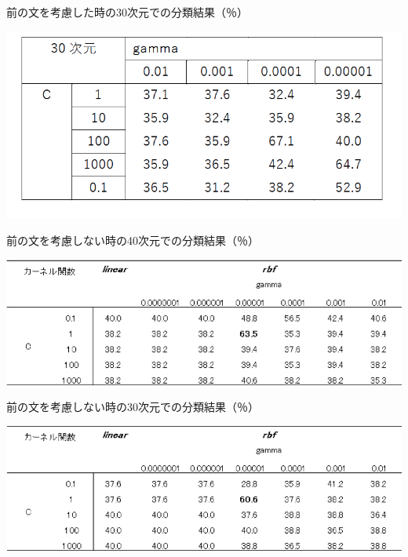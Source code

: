 \documentclass[shuuron]{kuee}
\begin{document}
\begin{table}
  \caption{前の文を考慮した時の30次元での分類結果（％）}
  \label{table:uetsuji2}
  \begin{center}
    \includegraphics[width=\linewidth]{uetsuji2.png}
  \end{center}
\end{table}

\begin{table}
  \caption{前の文を考慮しない時の40次元での分類結果（％）}
  \label{table:hayashida3}
  \begin{center}
    \includegraphics[width=\linewidth]{hayashida3.png}
  \end{center}
\end{table}

\begin{table}
  \caption{前の文を考慮しない時の30次元での分類結果（％）}
  \label{table:hayashida4}
  \begin{center}
    \includegraphics[width=\linewidth]{hayashida4.png}
  \end{center}
\end{table}
\end{document}
